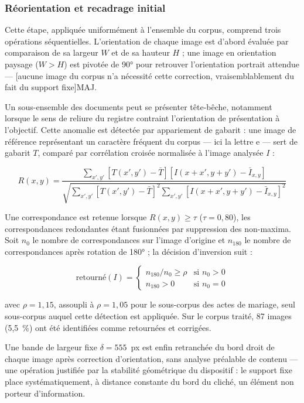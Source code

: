 \subsubsection*{Réorientation et recadrage initial}

Cette étape, appliquée uniformément à l'ensemble du corpus, comprend trois opérations séquentielles.
L'orientation de chaque image est d'abord évaluée par comparaison de sa largeur $W$ et de sa hauteur $H$ ; une image en orientation paysage ($W>H$) est pivotée de 90° pour retrouver l'orientation portrait attendue --- [aucune image du corpus n'a nécessité cette correction, vraisemblablement du fait du support fixe]MAJ.

Un sous-ensemble des documents peut se présenter tête-bêche, notamment lorsque le sens de reliure du registre contraint l'orientation de présentation à l'objectif. Cette anomalie est détectée par appariement de gabarit : une image de référence représentant un caractère fréquent du corpus --- ici la lettre e --- sert de gabarit $T$, comparé par corrélation croisée normalisée à l'image analysée $I$ :

\begin{equation}
    R(x,y) = \frac{\sum_{x',y'} \left[T(x',y') - \bar T\right]\left[I(x+x',y+y') - \bar I_{x,y}\right]}{\sqrt{\sum_{x',y'} \left[T(x',y') - \bar T\right]^2 \sum_{x',y'} \left[I(x+x',y+y') - \bar I_{x,y}\right]^2}}
\end{equation}


Une correspondance est retenue lorsque $R(x,y) \geq \tau$ ($\tau=0{,}80$), les correspondances redondantes étant fusionnées par suppression des non-maxima.
Soit $n_0$ le nombre de correspondances sur l'image d'origine et $n_{180}$ le nombre de correspondances après rotation de 180° ; la décision d'inversion suit :

\begin{equation}
    \text{retourné}(I) = \begin{cases}
        n_{180}/n_0 \geq \rho & \text{si } n_0 > 0 \\
        n_{180} > 0           & \text{si } n_0 = 0
    \end{cases}
\end{equation}

avec $\rho=1{,}15$, assoupli à $\rho=1{,}05$ pour le sous-corpus des actes de mariage, seul sous-corpus auquel cette détection est appliquée.
Sur le corpus traité, 87 images (5,5~\%) ont été identifiées comme retournées et corrigées.

Une bande de largeur fixe $\delta=555$~px est enfin retranchée du bord droit de chaque image après correction d'orientation, sans analyse préalable de contenu --- une opération justifiée par la stabilité géométrique du dispositif : le support fixe place systématiquement, à distance constante du bord du cliché, un élément non porteur d'information.

